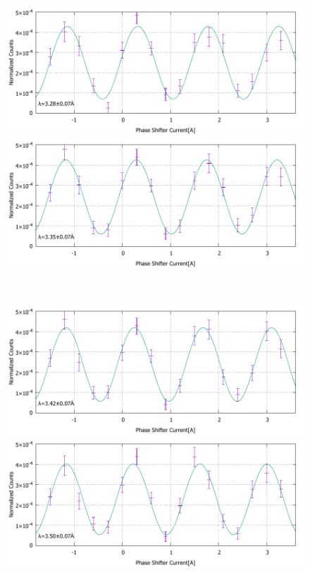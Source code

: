 \begin{figure}[h]
\begin{minipage}{0.5\hsize}
\end{minipage}\\
\begin{minipage}{0.5\hsize}
\includegraphics[width=\hsize]{discussion/IF_nb/Interference_nb_fit460.pdf}
\end{minipage}
\begin{minipage}{0.5\hsize}
\includegraphics[width=\hsize]{discussion/IF_nb/Interference_nb_fit470.pdf}
\end{minipage}\\
\begin{minipage}{0.5\hsize}
\includegraphics[width=\hsize]{discussion/IF_nb/Interference_nb_fit480.pdf}
\end{minipage}
\begin{minipage}{0.5\hsize}
\includegraphics[width=\hsize]{discussion/IF_nb/Interference_nb_fit490.pdf}

\end{minipage}
\end{figure}
